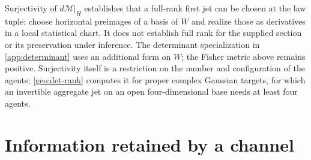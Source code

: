Surjectivity of $d\mathcal M|_H$ establishes that a full-rank first jet can be chosen at the law tuple: choose horizontal preimages of a basis of $W$ and realize those as derivatives in a local statistical chart. It does not establish full rank for the supplied section or its preservation under inference. The determinant specialization in \cref{app:determinant} uses an additional form on $W$; the Fisher metric above remains positive. Surjectivity itself is a restriction on the number and configuration of the agents; \cref{geo:det-rank} computes it for proper complex Gaussian targets, for which an invertible aggregate jet on an open four-dimensional base needs at least four agents.

\section{Information retained by a channel}

